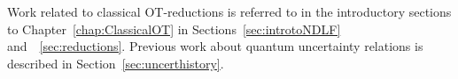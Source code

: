 Work related to classical OT-reductions is referred to in the introductory sections to
Chapter~\ref{chap:ClassicalOT} in Sections~\ref{sec:introtoNDLF}
and~~\ref{sec:reductions}.  Previous work about quantum uncertainty
relations is described in Section~\ref{sec:uncerthistory}.






